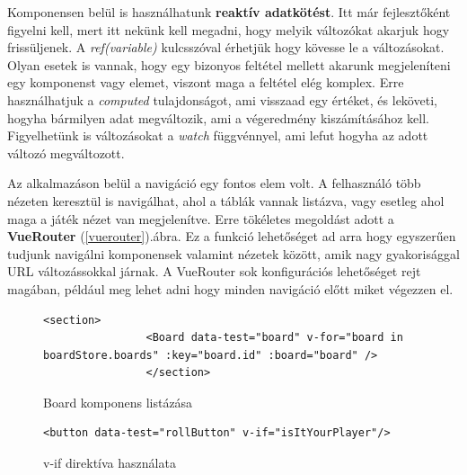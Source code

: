 \documentclass[a4paper,twoside]{article}
\begin{document}
Komponensen belül is használhatunk \textbf{reaktív adatkötést}. Itt már fejlesztőként figyelni kell, mert itt nekünk kell megadni, hogy melyik változókat akarjuk hogy frissüljenek. A \textit{ref(variable)} kulcsszóval érhetjük hogy kövesse le a változásokat. Olyan esetek is vannak, hogy egy bizonyos feltétel mellett akarunk megjeleníteni egy komponenst vagy elemet, viszont maga a feltétel elég komplex. Erre használhatjuk a \textit{computed} tulajdonságot, ami visszaad egy értéket, és leköveti, hogyha bármilyen adat megváltozik, ami a végeredmény kiszámításához kell. Figyelhetünk is változásokat a \textit{watch} függvénnyel, ami lefut hogyha az adott változó megváltozott. 

Az alkalmazáson belül a navigáció egy fontos elem volt. A felhasználó több nézeten keresztül is navigálhat, ahol a táblák vannak listázva, vagy esetleg ahol maga a játék nézet van megjelenítve. Erre tökéletes megoldást adott a \textbf{VueRouter} (\ref{vuerouter}).ábra. Ez a funkció lehetőséget ad arra hogy egyszerűen tudjunk navigálni komponensek valamint nézetek között, amik nagy gyakorisággal URL változássokkal járnak. A VueRouter sok konfigurációs lehetőséget rejt magában, például meg lehet adni hogy minden navigáció előtt miket végezzen el. 
\begin{figure}
	\caption{Board komponens listázása}
	\begin{adjustwidth}{0cm}{10cm}
		\begin{minipage}{\textwidth}
			\begin{lstlisting}[style=javascriptStyle]
				<section>
				<Board data-test="board" v-for="board in boardStore.boards" :key="board.id" :board="board" />
				</section>
			\end{lstlisting}
		\end{minipage}
	\end{adjustwidth}
	\label{komponens}
\end{figure}

\begin{figure}
	\caption{v-if direktíva használata}
	\begin{adjustwidth}{0cm}{10cm}
		\begin{minipage}{\textwidth}
			\begin{lstlisting}[style=javascriptStyle]
				<button data-test="rollButton" v-if="isItYourPlayer"/>
			\end{lstlisting}
		\end{minipage}
	\end{adjustwidth}
	\label{v-if}
\end{figure}
\end{document}

